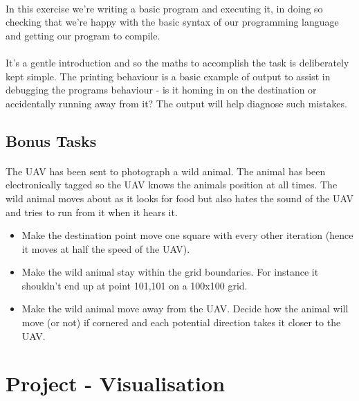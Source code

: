 \documentclass[11pt]{book}
\begin{document}
\paragraph{} In this exercise we're writing a basic program and executing it, in doing so checking that we're happy with the basic syntax of our programming language and getting our program to compile.

\paragraph{} It's a gentle introduction and so the maths to accomplish the task is deliberately kept simple. The printing behaviour is a basic example of output to assist in debugging the programs behaviour - is it homing in on the destination or accidentally running away from it? The output will help diagnose such mistakes.

\subsection{Bonus Tasks}

\paragraph{} The UAV has been sent to photograph a wild animal. The animal has been electronically tagged so the UAV knows the animals position at all times. The wild animal moves about as it looks for food but also hates the sound of the UAV and tries to run from it when it hears it.

\begin{itemize}
\item Make the destination point move one square with every other iteration (hence it moves at half the speed of the UAV).
\item Make the wild animal stay within the grid boundaries. For instance it shouldn't end up at point 101,101 on a 100x100 grid.
\item Make the wild animal move away from the UAV. Decide how the animal will move (or not) if cornered and each potential direction takes it closer to the UAV.
\end{itemize}

\clearpage




\section{Project - Visualisation}
\end{document}
